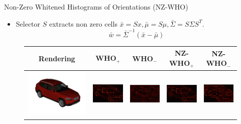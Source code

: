 \documentclass[serif,mathserif,final]{beamer}
\newcommand{\1}{\mathbb{I}} %
\begin{document}
\begin{frame}{}
\begin{columns}[t]
    \begin{column}{0.24\linewidth}


      \begin{block}{Non-Zero Whitened Histograms of Orientations (NZ-WHO)}
        \vspace{-0.1em}
        \begin{itemize}
          \item Selector $S$ extracts non zero cells $\bar{x} = S x, \bar{\mu} = S\mu, \bar{\Sigma} = S \Sigma S^T$. 
            \begin{equation}
              \bar{w}=\bar{\Sigma}^{-1}(\bar{x} - \bar{\mu}) \label{eq:nz-who}
            \end{equation}
        \end{itemize}

        \begin{figure}[t]
          \begin{center}
            \small
            \setlength\tabcolsep{3pt}
            \begin{tabular}{|c|c|c|c|c|}
              \hline
              Rendering & WHO$_+$ & WHO$_-$  & NZ-WHO$_+$ & NZ-WHO$_-$ \\
              \hline
              \includegraphics[width=0.16\linewidth]{rendering} &
              \includegraphics[width=0.18\linewidth]{whiten_all_crop} &
              \includegraphics[width=0.18\linewidth]{whiten_all_neg_crop}  &
              \includegraphics[width=0.18\linewidth]{whiten_non_zero_crop} &
              \includegraphics[width=0.18\linewidth]{whiten_non_zero_neg} \\
              \hline
            \end{tabular}
          \end{center}
        \end{figure}
      \end{block}


\end{column}
\end{columns}
\end{frame}
\end{document}
